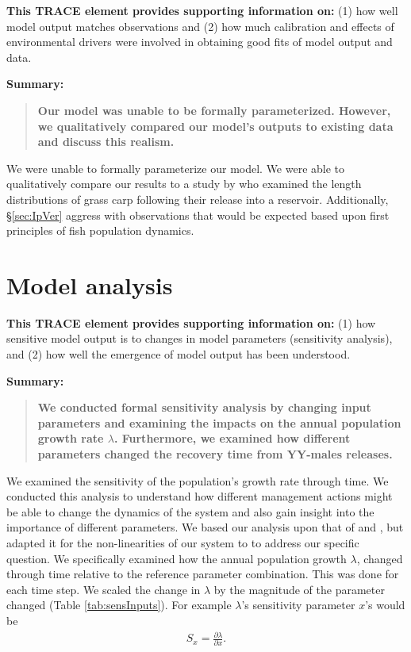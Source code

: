 \documentclass{article}[12pt]
\begin{document}
\textbf{This TRACE element provides supporting information on:} (1) how well model output matches observations and (2) how much calibration and effects of environmental drivers were involved in obtaining good fits of model output and data. 

\textbf{Summary:}
\begin{verse}
\textbf{
Our model was unable to be formally parameterized. However, we qualitatively compared our model's outputs to existing data and discuss this realism. 
}
\end{verse}

We were unable to formally parameterize our model. 
We were able to qualitatively compare our results to a study by \citet{martyn1986mapping} who examined the length distributions of grass carp following their release into a reservoir.
Additionally, \S \ref{sec:IpVer} aggress with observations that would be expected based upon first principles of fish population dynamics. 


\section{Model analysis}

\textbf{This TRACE element provides supporting information on:} (1) how sensitive model output is to changes in model parameters (sensitivity analysis), and (2) how well the emergence of model output has been understood. 

\textbf{Summary:}
\begin{verse}
\textbf{
We conducted formal sensitivity analysis by changing input parameters and examining the impacts on the annual population growth rate \(\lambda\).
Furthermore, we examined how different parameters changed the recovery time from YY-males releases. 
}
\end{verse}

We examined the sensitivity of the population's growth rate through time.
We conducted this analysis to understand how different management actions might be able to change the dynamics of the system and also gain insight into the importance of different parameters. 
We based our analysis upon that of \citet{easterling2000size} and \citet{caswell_matrix_2001}, but adapted it for the non-linearities of our system to to address our specific question. 
We specifically examined how the annual population growth \(\lambda\), changed through time relative to the reference parameter combination.
This was done for each time step.
We scaled the change in \(\lambda\) by the magnitude of the parameter changed (Table \ref{tab:sensInputs}).
For example  \(\lambda\)'s sensitivity parameter \(x\)'s would be
\begin{eqnarray}
S_x = \frac{\partial \lambda}{\partial x}.
\end{eqnarray}
\end{document}
